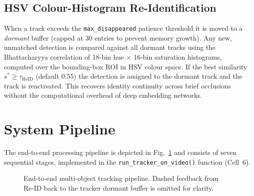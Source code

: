 \documentclass[10pt, conference, compsocconf]{IEEEtran}
\begin{document}
\subsection{HSV Colour-Histogram Re-Identification}
When a track exceeds the \texttt{max\_disappeared} patience threshold
it is moved to a \emph{dormant} buffer (capped at 30 entries to
prevent memory growth). Any new, unmatched detection
is compared against all dormant tracks using the Bhattacharyya
correlation of 18-bin hue $\times$ 16-bin saturation histograms,
computed over the bounding-box ROI in HSV colour space. If
the best similarity $s^* \geq \tau_\text{ReID}$ (default 0.55) the
detection is assigned to the dormant track and the track is
reactivated. This recovers identity continuity across brief
occlusions without the computational overhead of deep embedding
networks.

\section{System Pipeline}

The end-to-end processing pipeline is depicted in Fig.~\ref{fig:pipeline}
and consists of seven sequential stages, implemented in the
\texttt{run\_tracker\_on\_video()} function (Cell~6).

\begin{figure}[!t]
\centering
{}
\caption{End-to-end multi-object tracking pipeline. Dashed feedback
from Re-ID back to the tracker dormant buffer is omitted for clarity.}
\label{fig:pipeline}
\end{figure}
\end{document}
